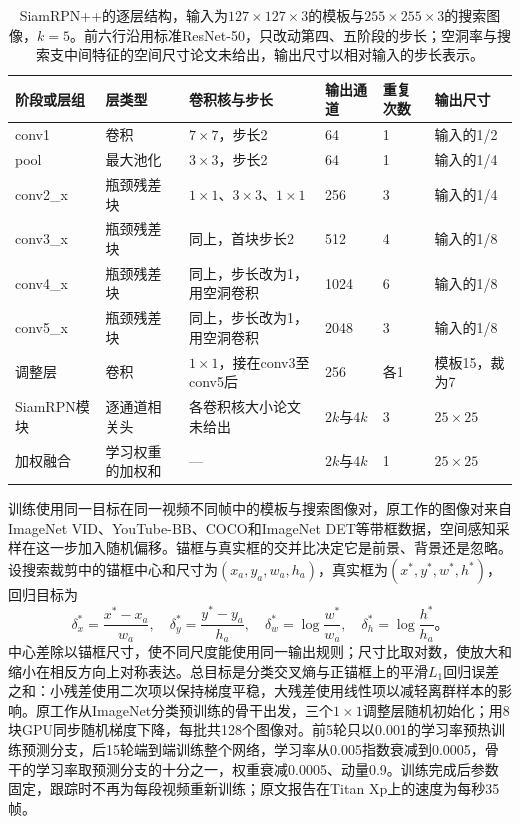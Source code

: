 \begin{table}[tbp]
  \centering
  \small
  \begin{tabularx}{\linewidth}{@{}lXXlll@{}}
    \toprule
    阶段或层组 & 层类型 & 卷积核与步长 & 输出通道 & 重复次数 & 输出尺寸\\
    \midrule
    conv1 & 卷积 & $7\times7$，步长2 & 64 & 1 & 输入的1/2\\
    pool & 最大池化 & $3\times3$，步长2 & 64 & 1 & 输入的1/4\\
    conv2\_x & 瓶颈残差块 & $1\times1$、$3\times3$、$1\times1$ & 256 & 3 & 输入的1/4\\
    conv3\_x & 瓶颈残差块 & 同上，首块步长2 & 512 & 4 & 输入的1/8\\
    conv4\_x & 瓶颈残差块 & 同上，步长改为1，用空洞卷积 & 1024 & 6 & 输入的1/8\\
    conv5\_x & 瓶颈残差块 & 同上，步长改为1，用空洞卷积 & 2048 & 3 & 输入的1/8\\
    调整层 & 卷积 & $1\times1$，接在conv3至conv5后 & 256 & 各1 & 模板15，裁为7\\
    SiamRPN模块 & 逐通道相关头 & 各卷积核大小论文未给出 & $2k$与$4k$ & 3 & $25\times25$\\
    加权融合 & 学习权重的加权和 & — & $2k$与$4k$ & 1 & $25\times25$\\
    \bottomrule
  \end{tabularx}
  \caption{SiamRPN++的逐层结构，输入为$127\times127\times3$的模板与$255\times255\times3$的搜索图像，$k=5$。前六行沿用标准ResNet-50，只改动第四、五阶段的步长；空洞率与搜索支中间特征的空间尺寸论文未给出，输出尺寸以相对输入的步长表示。}
  \label{tab:vision-video-siamrpn-arch}
\end{table}

训练使用同一目标在同一视频不同帧中的模板与搜索图像对，原工作的图像对来自ImageNet VID、YouTube-BB、COCO和ImageNet DET等带框数据，空间感知采样在这一步加入随机偏移。锚框与真实框的交并比决定它是前景、背景还是忽略。设搜索裁剪中的锚框中心和尺寸为$(x_a,y_a,w_a,h_a)$，真实框为$(x^*,y^*,w^*,h^*)$，回归目标为
\[
  \delta_x^*=\frac{x^*-x_a}{w_a},\quad
  \delta_y^*=\frac{y^*-y_a}{h_a},\quad
  \delta_w^*=\log\frac{w^*}{w_a},\quad
  \delta_h^*=\log\frac{h^*}{h_a}\text{。}
\]
中心差除以锚框尺寸，使不同尺度能使用同一输出规则；尺寸比取对数，使放大和缩小在相反方向上对称表达。总目标是分类交叉熵与正锚框上的平滑$L_1$回归误差之和：小残差使用二次项以保持梯度平稳，大残差使用线性项以减轻离群样本的影响。原工作从ImageNet分类预训练的骨干出发，三个$1\times1$调整层随机初始化；用8块GPU同步随机梯度下降，每批共128个图像对。前5轮只以0.001的学习率预热训练预测分支，后15轮端到端训练整个网络，学习率从0.005指数衰减到0.0005，骨干的学习率取预测分支的十分之一，权重衰减0.0005、动量0.9。训练完成后参数固定，跟踪时不再为每段视频重新训练；原文报告在Titan Xp上的速度为每秒35帧。

